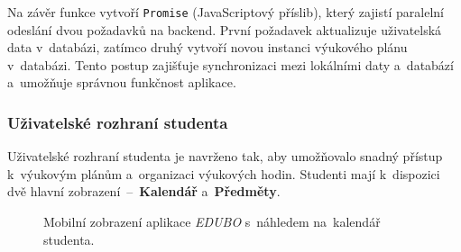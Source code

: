 \documentclass[male,czech,api_bc]{kitheses}
\begin{document}
Na závěr funkce vytvoří \texttt{Promise} (JavaScriptový příslib), který zajistí paralelní odeslání dvou požadavků na backend. První požadavek aktualizuje uživatelská data v~databázi, zatímco druhý vytvoří novou instanci výukového plánu v~databázi. Tento postup zajišťuje synchronizaci mezi lokálními daty a~databází a~umožňuje správnou funkčnost aplikace.

\subsubsection{Uživatelské rozhraní studenta}

Uživatelské rozhraní studenta je navrženo tak, aby umožňovalo snadný přístup k~výukovým plánům a~organizaci výukových hodin. Studenti mají k~dispozici dvě hlavní zobrazení~--~\textbf{Kalendář} a~\textbf{Předměty}.

\begin{figure}[H]
	\centering
	\caption{Mobilní zobrazení aplikace \textit{EDUBO} s~náhledem na~kalendář studenta.}
	\label{fig:edubo-5}
\end{figure}
\end{document}
